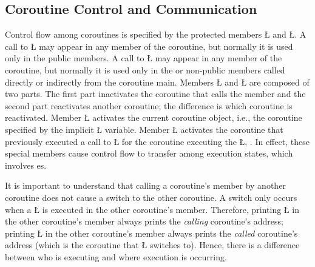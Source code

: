 \documentclass[openright,twoside]{report}
\begin{document}
\subsection{Coroutine Control and Communication}
\label{s:CoroutineControlCommunication}

\enlargethispage{15pt}
Control flow among coroutines is specified by the protected members \LGinlinetrue\LGbegin\lgrinde\L{}\endlgrinde\LGend{} and \LGinlinetrue\LGbegin\lgrinde\L{}\endlgrinde\LGend{}.
A call to \LGinlinetrue\LGbegin\lgrinde\L{}\endlgrinde\LGend{} may appear in any member of the coroutine, but normally it is used only in the public members.
A call to \LGinlinetrue\LGbegin\lgrinde\L{}\endlgrinde\LGend{} may appear in any member of the coroutine, but normally it is used only in the  or non-public members called directly or indirectly from the coroutine main.
Members \LGinlinetrue\LGbegin\lgrinde\L{}\endlgrinde\LGend{} and \LGinlinetrue\LGbegin\lgrinde\L{}\endlgrinde\LGend{} are composed of two parts.
The first part inactivates the coroutine that calls the member and the second part reactivates another coroutine;
the difference is which coroutine is reactivated.
Member \LGinlinetrue\LGbegin\lgrinde\L{}\endlgrinde\LGend{} activates the current coroutine object, i.e., the coroutine specified by the implicit \LGinlinetrue\LGbegin\lgrinde\L{}\endlgrinde\LGend{} variable.
Member \LGinlinetrue\LGbegin\lgrinde\L{}\endlgrinde\LGend{} activates the coroutine that previously executed a call to \LGinlinetrue\LGbegin\lgrinde\L{}\endlgrinde\LGend{} for the coroutine executing the \LGinlinetrue\LGbegin\lgrinde\L{}\endlgrinde\LGend{}, .
In effect, these special members cause control flow to transfer among execution states, which involves es.

It is important to understand that calling a coroutine's member by another coroutine does not cause a switch to the other coroutine.
A switch only occurs when a \LGinlinetrue\LGbegin\lgrinde\L{}\endlgrinde\LGend{} is executed in the other coroutine's member.
Therefore, printing \LGinlinetrue\LGbegin\lgrinde\L{}\endlgrinde\LGend{} in the other coroutine's member always prints the \emph{calling} coroutine's address;
printing \LGinlinetrue\LGbegin\lgrinde\L{}\endlgrinde\LGend{} in the other coroutine's member always prints the \emph{called} coroutine's address (which is the coroutine that \LGinlinetrue\LGbegin\lgrinde\L{}\endlgrinde\LGend{} switches to).
Hence, there is a difference between who is executing and where execution is occurring.
\end{document}
